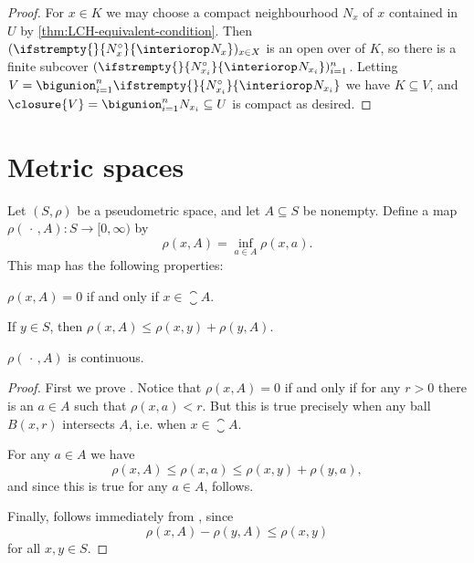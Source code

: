 \documentclass[article, a4paper, 11pt, oneside]{memoir}
\numberwithin{equation}{chapter}
\renewcommand\interior[2][]{%
    \ifstrempty{#1}{%
        #2^{\circ}
    }{%
        \interiorop_{#1}#2
    }%
}
\begin{document}
\begin{proof}
    For $x \in K$ we may choose a compact neighbourhood $N_x$ of $x$ contained in $U$ by \cref{thm:LCH-equivalent-condition}. Then $(\interior{N_x})_{x \in X}$ is an open over of $K$, so there is a finite subcover $(\interior{N_{x_i}})_{i=1}^n$. Letting $V = \bigunion_{i=1}^n \interior{N_{x_i}}$ we have $K \subseteq V$, and $\closure{V} = \bigunion_{i=1}^n N_{x_i} \subseteq U$ is compact as desired.
\end{proof}


\section{Metric spaces}

\begin{lemma}
    \label{thm:distance-to-set}
    Let $(S,\rho)$ be a pseudometric space, and let $A \subseteq S$ be nonempty. Define a map $\rho(\,\cdot\,, A) \colon S \to [0, \infty)$ by
    \begin{equation*}
        \rho(x, A) = \inf_{a \in A} \rho(x,a).
    \end{equation*}
    This map has the following properties:
    \begin{enumlem}
        \item \label{enum:distance-to-set-closure} $\rho(x,A) = 0$ if and only if $x \in \closure{A}$.

        \item \label{enum:distance-to-set-triangle-inequality} If $y \in S$, then $\rho(x,A) \leq \rho(x,y) + \rho(y,A)$.

        \item \label{enum:distance-to-set-continuous} $\rho(\,\cdot\,, A)$ is continuous.
    \end{enumlem}
\end{lemma}

\begin{proof}
    First we prove . Notice that $\rho(x,A) = 0$ if and only if for any $r > 0$ there is an $a \in A$ such that $\rho(x,a) < r$. But this is true precisely when any ball $B(x,r)$ intersects $A$, i.e. when $x \in \closure{A}$.

    For any $a \in A$ we have
    \begin{equation*}
        \rho(x,A)
            \leq \rho(x,a)
            \leq \rho(x,y) + \rho(y,a),
    \end{equation*}
    and since this is true for any $a \in A$,  follows.

    Finally,  follows immediately from , since
    \begin{equation*}
        \rho(x,A) - \rho(y,A)
            \leq \rho(x,y)
    \end{equation*}
    for all $x,y \in S$.
\end{proof}
\end{document}
